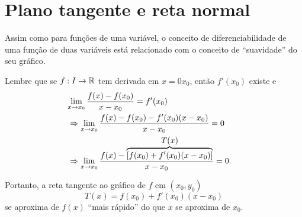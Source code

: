 \section{Plano tangente e reta normal}

Assim como para funções de uma variável, o conceito de diferenciabilidade de uma função de duas variáveis está relacionado com o conceito de ``suavidade'' do seu gráfico.

Lembre que se \(f:I\to\mathbb{R}\) tem derivada em \(x = 0x_0\), então \(f'(x_0)\) existe e 
    \begin{align*}
        {\lefteqn{\lim_{x\to x_0} \frac{f(x)-f(x_0)}{x-x_0} = f'(x_0)}} \\
            & \Rightarrow \lim_{x\to x_0} \frac{f(x)-f(x_0)-f'(x_0)(x-x_0)}{x-x_0} = 0 \\
            & \Rightarrow \lim_{x\to x_0} \frac{f(x) - \overbrace{[f(x_0) + f'(x_0)(x-x_0)]}^{\displaystyle T(x)}}{x-x_0} = 0.
    \end{align*}

Portanto, a reta tangente ao gráfico de \(f\) em \((x_0,y_0)\) \[T(x) = f(x_0) + f'(x_0)(x-x_0)\] se aproxima de \(f(x)\) ``mais rápido'' do que \(x\) se aproxima de \(x_0\).

